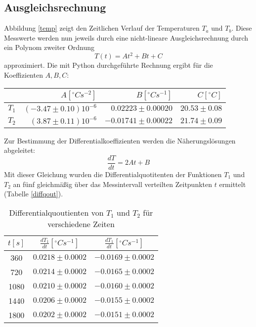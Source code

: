 \documentclass[11pt]{article}
\begin{document}
\subsection{Ausgleichsrechnung}
Abbildung \ref{temp} zeigt den Zeitlichen Verlauf der Temperaturen $T_a$ und $T_b$. Diese Messwerte werden nun jeweils durch eine nicht-lineare Ausgleichsrechnung durch ein Polynom zweiter Ordnung
 \begin{equation}
T(t)= At^2+Bt+C 
 \end{equation}
 approximiert. Die mit Python durchgeführte Rechnung ergibt für die Koeffizienten $A, B, C$:
\begin{table}[h]
\centering

\begin{tabular}{l|r|r|r}
	 & $A [^\circ Cs^{-2}]$ & $B [^\circ Cs^{-1}]$ & $C [^\circ C]$ \\
\hline
$T_1$ & $(-3.47\pm0.10)10^{-6}$ & $0.02223\pm0.00020$ & $20.53\pm0.08$\\
$T_2$ & $(3.87\pm0.11)10^{-6}$ & $-0.01741\pm0.00022$ & $21.74\pm0.09$\\
\end{tabular}
\end{table}
Zur Bestimmung der Differentialkoeffizienten werden die Näherungslösungen abgeleitet:
\begin{equation}
\frac{dT}{dt} = 2At+B
\end{equation}
Mit dieser Gleichung wurden die Differentialquotitenten der Funktionen $T_1$ und $T_2$ an fünf gleichmäßig über das Messintervall verteilten Zeitpunkten $t$ ermittelt (Tabelle \ref{diffqout}).
\begin{table}[h]
\centering
\begin{tabular}{c|c|c}
$t [s]$ & $\frac{dT_1}{dt} [^\circ Cs^{-1}]$ & $\frac{dT_1}{dt}[^\circ Cs^{-1}]$\\
\hline
360  &$0.0218\pm0.0002$ & $-0.0169\pm0.0002$\\
720  &$0.0214\pm0.0002$ & $-0.0165\pm0.0002$\\
1080 &$0.0210\pm0.0002$ & $-0.0160\pm0.0002$\\
1440 &$0.0206\pm0.0002$ & $-0.0155\pm0.0002$\\
1800 &$0.0202\pm0.0002$ & $-0.0151\pm0.0002$\\
\end{tabular}
\label{diffquot}
\caption{Differentialquoutienten von $T_1$ und $T_2$ für verschiedene Zeiten}
\end{table}
\end{document}
